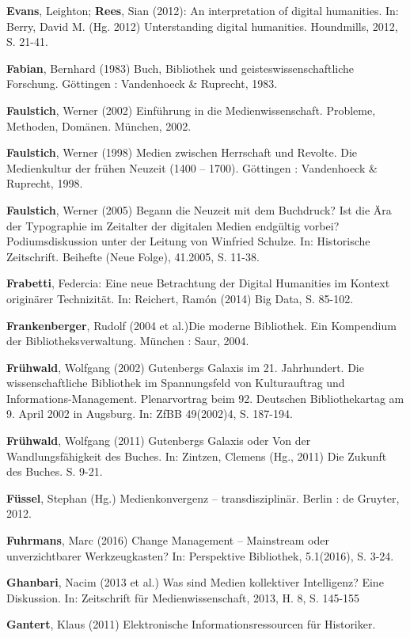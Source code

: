 \documentclass[a4paper,
fontsize=11pt,
oneside,
numbers=noperiodatend,
parskip=half-,
bibliography=totoc,
final
]{scrartcl}
\begin{document}
\textbf{Evans}, Leighton; \textbf{Rees}, Sian (2012): An interpretation
of digital humanities. In: Berry, David M. (Hg. 2012) Unterstanding
digital humanities. Houndmills, 2012, S. 21-41.

\textbf{Fabian}, Bernhard (1983) Buch, Bibliothek und
geisteswissenschaftliche Forschung. Göttingen : Vandenhoeck \& Ruprecht,
1983.

\textbf{Faulstich}, Werner (2002) Einführung in die Medienwissenschaft.
Probleme, Methoden, Domänen. München, 2002.

\textbf{Faulstich}, Werner (1998) Medien zwischen Herrschaft und
Revolte. Die Medienkultur der frühen Neuzeit (1400 -- 1700). Göttingen :
Vandenhoeck \& Ruprecht, 1998.

\textbf{Faulstich}, Werner (2005) Begann die Neuzeit mit dem Buchdruck?
Ist die Ära der Typographie im Zeitalter der digitalen Medien endgültig
vorbei? Podiumsdiskussion unter der Leitung von Winfried Schulze. In:
Historische Zeitschrift. Beihefte (Neue Folge), 41.2005, S. 11-38.

\textbf{Frabetti}, Federcia: Eine neue Betrachtung der Digital
Humanities im Kontext originärer Technizität. In: Reichert, Ramón (2014)
Big Data, S. 85-102.

\textbf{Frankenberger}, Rudolf (2004 et al.)Die moderne Bibliothek. Ein
Kompendium der Bibliotheksverwaltung. München : Saur, 2004.

\textbf{Frühwald}, Wolfgang (2002) Gutenbergs Galaxis im 21.
Jahrhundert. Die wissenschaftliche Bibliothek im Spannungsfeld von
Kulturauftrag und Informations-Management. Plenarvortrag beim 92.
Deutschen Bibliothekartag am 9. April 2002 in Augsburg. In: ZfBB
49(2002)4, S. 187-194.

\textbf{Frühwald}, Wolfgang (2011) Gutenbergs Galaxis oder Von der
Wandlungsfähigkeit des Buches. In: Zintzen, Clemens (Hg., 2011) Die
Zukunft des Buches. S. 9-21.

\textbf{Füssel}, Stephan (Hg.) Medienkonvergenz -- transdisziplinär.
Berlin : de Gruyter, 2012.

\textbf{Fuhrmans}, Marc (2016) Change Management -- Mainstream oder
unverzichtbarer Werkzeugkasten? In: Perspektive Bibliothek, 5.1(2016),
S. 3-24.

\textbf{Ghanbari}, Nacim (2013 et al.) Was sind Medien kollektiver
Intelligenz? Eine Diskussion. In: Zeitschrift für Medienwissenschaft,
2013, H. 8, S. 145-155

\textbf{Gantert}, Klaus (2011) Elektronische Informationsressourcen für
Historiker.
\end{document}
